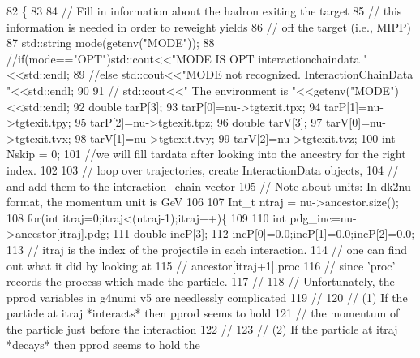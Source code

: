 \begin{DoxyCode}
82                                                               \{
83     
84     \textcolor{comment}{// Fill in information about the hadron exiting the target}
85     \textcolor{comment}{// this information is needed in order to reweight yields}
86     \textcolor{comment}{// off the target (i.e., MIPP)}
87     std::string mode(getenv(\textcolor{stringliteral}{"MODE"}));
88     \textcolor{comment}{//if(mode=="OPT")std::cout<<"MODE IS OPT interactionchaindata "<<std::endl;}
89     \textcolor{comment}{//else std::cout<<"MODE not recognized. InteractionChainData "<<std::endl;}
90     
91    \textcolor{comment}{// std::cout<<" The environment is "<<getenv("MODE")<<std::endl;}
92     \textcolor{keywordtype}{double} tarP[3];
93     tarP[0]=nu->tgtexit.tpx;
94     tarP[1]=nu->tgtexit.tpy;
95     tarP[2]=nu->tgtexit.tpz;
96     \textcolor{keywordtype}{double} tarV[3];
97     tarV[0]=nu->tgtexit.tvx;
98     tarV[1]=nu->tgtexit.tvy;
99     tarV[2]=nu->tgtexit.tvz;
100     \textcolor{keywordtype}{int} Nskip = 0;
101     \textcolor{comment}{//we will fill tardata after looking into the ancestry for the right index.}
102     
103     \textcolor{comment}{// loop over trajectories, create InteractionData objects,}
104     \textcolor{comment}{// and add them to the interaction\_chain vector}
105     \textcolor{comment}{// Note about units: In dk2nu format, the momentum unit is GeV}
106 
107     Int\_t ntraj = nu->ancestor.size();
108     \textcolor{keywordflow}{for}(\textcolor{keywordtype}{int} itraj=0;itraj<(ntraj-1);itraj++)\{
109       
110       \textcolor{keywordtype}{int} pdg\_inc=nu->ancestor[itraj].pdg;
111       \textcolor{keywordtype}{double} incP[3];
112       incP[0]=0.0;incP[1]=0.0;incP[2]=0.0;
113       \textcolor{comment}{// itraj is the index of the projectile in each interaction.}
114       \textcolor{comment}{// one can find out what it did by looking at}
115       \textcolor{comment}{//       ancestor[itraj+1].proc}
116       \textcolor{comment}{// since 'proc' records the process which made the particle.}
117       \textcolor{comment}{//}
118       \textcolor{comment}{// Unfortunately, the pprod variables in g4numi v5 are needlessly complicated}
119       \textcolor{comment}{//}
120       \textcolor{comment}{// (1) If the particle at itraj *interacts* then pprod seems to hold}
121       \textcolor{comment}{// the momentum of the particle just before the interaction}
122       \textcolor{comment}{// }
123       \textcolor{comment}{// (2) If the particle at itraj *decays* then pprod seems to hold the}

\end{DoxyCode}
